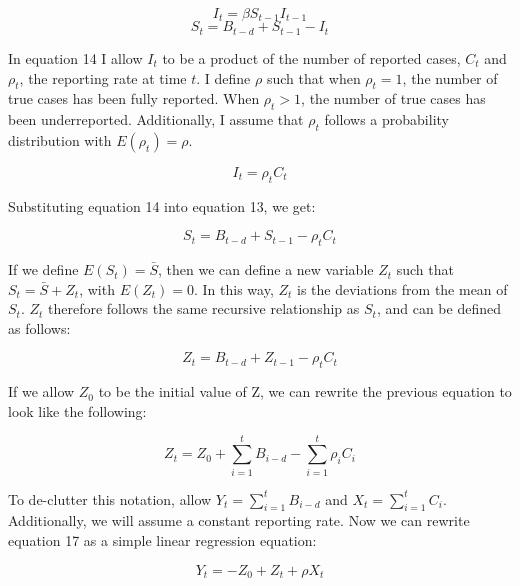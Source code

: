 \documentclass{article}
\begin{document}
\begin{equation}
I_{t} = \beta S_{t-1} I_{t-1}
\end{equation}
\begin{equation}
S_{t} = B_{t-d} + S_{t-1} - I_{t}
\end{equation}

In equation 14 I allow $I_{t}$ to be a product of the number of reported cases, $C_{t}$ and $\rho_{t}$, the reporting rate at time $t$. I define $\rho$ such that when $\rho_{t} =1$, the number of true cases has been fully reported. When $\rho_{t} > 1$, the number of true cases has been underreported. Additionally, I assume that $\rho_{t}$ follows a probability distribution with  $E(\rho_{t}) = \rho$.

\begin{equation}
I_{t} = \rho_{t}C_{t}
\end{equation}

Substituting equation 14 into equation 13, we get: 

\begin{equation}
S_{t} = B_{t-d} + S_{t-1} -  \rho_{t} C_{t}
\end{equation}

If we define $E(S_{t})=\bar{S}$, then we can define a new variable $Z_{t}$ such that $S_{t} = \bar{S} + Z_{t}$, with $E(Z_{t})=0$. In this way, $Z_{t}$ is the deviations from the mean of $S_{t}$. $Z_{t}$ therefore follows the same recursive relationship as $S_{t}$, and can be defined as follows:

\begin{equation}
Z_{t} = B_{t-d} + Z_{t-1} -  \rho_{t} C_{t}
\end{equation}

If we allow $Z_{0}$ to be the initial value of Z, we can rewrite the previous equation to look like the following:

\begin{equation}
Z_{t} = Z_{0} + \sum_{i=1}^{t} B_{i-d} - \sum_{i=1}^{t} \rho_{i}C_{i}
\end{equation}

To de-clutter this notation, allow $Y_{t}=\sum_{i=1}^{t} B_{i-d}$ and $X_{t}= \sum_{i=1}^{t}C_{i}$. Additionally, we will assume a constant reporting rate. Now we can rewrite equation 17 as a simple linear regression equation:

\begin{equation}
Y_{t} = -Z_{0} + Z_{t} + \rho X_{t}
\end{equation}
\end{document}
